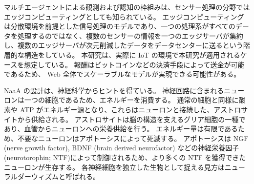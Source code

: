 マルチエージェントによる観測および認知の枠組みは、センサー処理の分野ではエッジコンピューティング\citep{bonomi2012fog}としても知られている。
エッジコンピューティングは分散環境を前提とした信号処理のモデルであり、一つの処理系がすべてのデータを処理するのではなく、複数のセンサーの情報を一つのエッジサーバが集約し、複数のエッジサーバが次元削減したデータをデータセンターに送るという階層的な構造をしている。
本研究は、実際に IoT の環境で本研究が適用されるケースを想定している。
報酬はビットコインなどの決済手段によって送金が可能であるため、
Web 全体でスケーラブルなモデルが実現できる可能性がある。

NaaA の設計は、神経科学からヒントを得ている。
神経回路に含まれるニューロンは一つの細胞であるため、エネルギーを消費する。
通常の細胞と同様に酸素や ATP がエネルギー源となり、これらはニューロンと接続した、アストロサイトから供給される。
アストロサイトは脳の構造を支えるグリア細胞の一種であり、血管からニューロンへの栄養供給を行う。
エネルギー量は有限であるため、不要なニューロンはアポトーシスによって死滅する。
アポトーシスは NGF (nerve growth factor), BDNF (brain derived neurofactor) などの神経栄養因子(neurotorophin; NTF)によって制御されるため、より多くの NTF を獲得できたニューロンが生存する。
各神経細胞を独立した生物として捉える見方はニューラルダーウィズム\citep{edelman1987neural}と呼ばれる。

